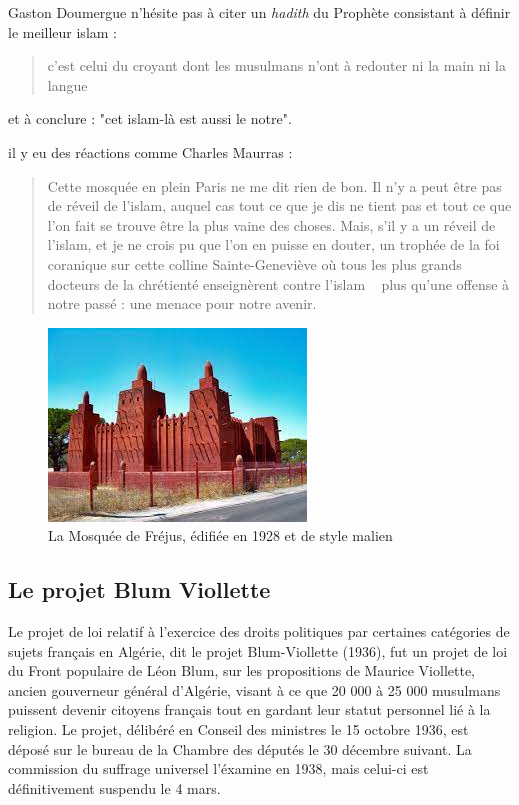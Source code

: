 Gaston Doumergue n'hésite pas à citer un \emph{hadith} du Prophète consistant à définir le meilleur islam : 
\begin{quote}
    c'est celui du croyant dont les musulmans n'ont à redouter ni la main ni la langue
\end{quote}
et à conclure : "cet islam-là est aussi le notre".


il y eu des réactions comme Charles Maurras : 
\begin{quote}
    Cette mosquée en plein Paris ne me dit rien de
bon. Il n'y a peut être pas de réveil de l'islam, auquel cas tout ce
que je dis ne tient pas et tout ce que l'on fait se trouve être la plus vaine des choses. Mais, s'il y a un réveil de l'islam, et je ne
crois pu que l'on en puisse en douter, un trophée de la foi coranique sur cette colline Sainte-Geneviève où tous les plus grands docteurs
de la chrétienté enseignèrent contre l'islam ~ plus
qu'une offense à notre passé : une menace pour notre avenir. 
\end{quote}

\begin{figure}
    \centering
    \includegraphics[width=\textwidth]{Images/MosqueeFrejus.jpg}
    \caption{La Mosquée de Fréjus, édifiée en 1928 et de style malien}
    \label{fig:Frejus}
\end{figure}

\subsection{Le projet Blum Viollette}
Le projet de loi relatif à l'exercice des droits politiques par certaines catégories de sujets français en Algérie, dit le projet Blum-Viollette (1936), fut un projet de loi du Front populaire de Léon Blum, sur les propositions de Maurice Viollette, ancien gouverneur général d'Algérie, visant à ce que 20 000 à 25 000 musulmans puissent devenir citoyens français tout en gardant leur statut personnel lié à la religion. Le projet, délibéré en Conseil des ministres le 15 octobre 1936, est déposé sur le bureau de la Chambre des députés le 30 décembre suivant. La commission du suffrage universel l'éxamine en 1938, mais celui-ci est définitivement suspendu le 4 mars.

